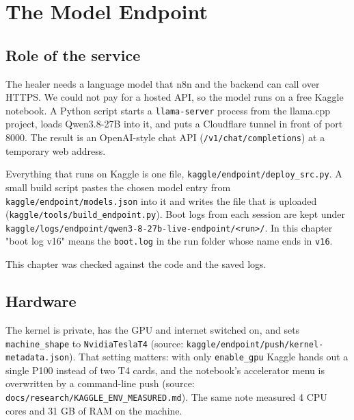 
\chapter{The Model Endpoint}

\section{Role of the service}



The healer needs a language model that n8n and the backend can call over HTTPS. We could not pay for a hosted API, so the model runs on a free Kaggle notebook. A Python script starts a \texttt{llama-\allowbreak{}server} process from the llama.cpp project, loads Qwen3.8-27B into it, and puts a Cloudflare tunnel in front of port 8000. The result is an OpenAI-style chat API (\texttt{/\allowbreak{}v1/\allowbreak{}chat/\allowbreak{}completions}) at a temporary web address.

Everything that runs on Kaggle is one file, \texttt{kaggle/\allowbreak{}endpoint/\allowbreak{}deploy\_\allowbreak{}src.\allowbreak{}py}. A small build script pastes the chosen model entry from \texttt{kaggle/\allowbreak{}endpoint/\allowbreak{}models.\allowbreak{}json} into it and writes the file that is uploaded (\texttt{kaggle/\allowbreak{}tools/\allowbreak{}build\_\allowbreak{}endpoint.\allowbreak{}py}). Boot logs from each session are kept under \texttt{kaggle/\allowbreak{}logs/\allowbreak{}endpoint/\allowbreak{}qwen3-\allowbreak{}8-\allowbreak{}27b-\allowbreak{}live-\allowbreak{}endpoint/\allowbreak{}\textless{}run\textgreater{}/\allowbreak{}}. In this chapter "boot log v16" means the \texttt{boot.\allowbreak{}log} in the run folder whose name ends in \texttt{v16}.

This chapter was checked against the code and the saved logs.

\section{Hardware}

The kernel is private, has the GPU and internet switched on, and sets \texttt{machine\_\allowbreak{}shape} to \texttt{NvidiaTeslaT4} (source: \texttt{kaggle/\allowbreak{}endpoint/\allowbreak{}push/\allowbreak{}kernel-\allowbreak{}metadata.\allowbreak{}json}). That setting matters: with only \texttt{enable\_\allowbreak{}gpu} Kaggle hands out a single P100 instead of two T4 cards, and the notebook's accelerator menu is overwritten by a command-line push (source: \texttt{docs/\allowbreak{}research/\allowbreak{}KAGGLE\_\allowbreak{}ENV\_\allowbreak{}MEASURED.\allowbreak{}md}). The same note measured 4 CPU cores and 31 GB of RAM on the machine.

